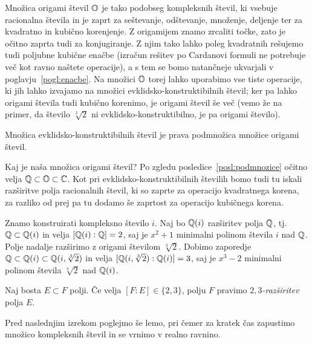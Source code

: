 Množica origami števil $\mathbb O$ je tako podobseg kompleksnih števil, ki vsebuje racionalna števila in je zaprt za seštevanje, odštevanje, množenje, deljenje ter za kvadratno in kubično korenjenje. Z origamijem znamo zrcaliti točke, zato je očitno zaprta tudi za konjugiranje. Z njim tako lahko poleg kvadratnih rešujemo tudi poljubne kubične enačbe (izračun rešitev po Cardanovi formuli ne potrebuje več kot ravno naštete operacije), a s tem se bomo natančneje ukvarjali v poglavju~\ref{pogl:enacbe}.
Na množici $\mathbb O$ torej lahko uporabimo vse tiste operacije, ki jih lahko izvajamo na množici evklidsko-konstruktibilnih števil; ker pa lahko origami števila tudi kubično korenimo, je origami števil še več (vemo že na primer, da število $\sqrt[3]{2}$ ni evklidsko-konstruktibilno, je pa origami število).

\begin{posledica}
    Množica evklidsko-konstruktibilnih števil je prava podmnožica množice origami števil.
\end{posledica}

Kaj je naša množica origami števil? Po zgledu posledice~\ref{posl:podmnozice} očitno velja $\mathbb Q \subset \mathbb O \subset \mathbb C$. Kot pri evklidsko-konstruktibilnih številih bomo tudi tu iskali razširitve polja racionalnih števil, ki so zaprte za operacijo kvadratnega korena, za razliko od prej pa tu dodamo še zaprtost za operacijo kubičnega korena.

Znamo konstruirati kompleksno število $i$. Naj bo $\mathbb Q(i)$ razširitev polja $\mathbb Q$, tj.\ $\mathbb Q \subset \mathbb Q(i)$ in velja $[\mathbb Q(i) : \mathbb Q] = 2$, saj je $x^2 + 1$ minimalni polinom števila $i$ nad $\mathbb Q$. Polje nadalje razširimo z origami številom $\sqrt[3]{2}$. Dobimo zaporedje $\mathbb Q \subset \mathbb Q(i) \subset \mathbb Q(i, \sqrt[3]{2})$ in velja $[\mathbb Q(i, \sqrt[3]{2}) : \mathbb Q(i)] = 3$, saj je $x^3 - 2$ minimalni polinom števila $\sqrt[3]{2}$ nad $\mathbb Q(i)$.

\begin{definicija}
    Naj bosta $E \subset F$ polji. Če velja $[F:E] \in \{2,3\}$, polju $F$ pravimo \emph{$2,3$-razširitev} polja $E$.
\end{definicija}

Pred naslednjim izrekom poglejmo še lemo, pri čemer za kratek čas zapustimo množico kompleksnih števil in se vrnimo v realno ravnino.

